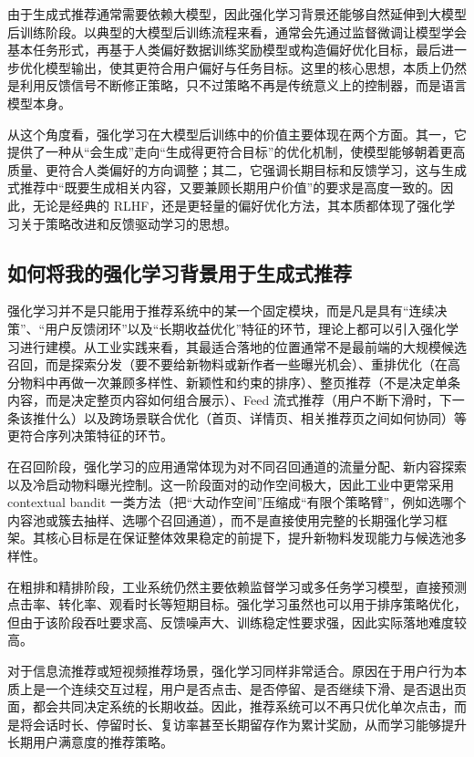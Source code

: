 \documentclass[UTF8]{ctexart}
\begin{document}
由于生成式推荐通常需要依赖大模型，因此强化学习背景还能够自然延伸到大模型后训练阶段。以典型的大模型后训练流程来看，通常会先通过监督微调让模型学会基本任务形式，再基于人类偏好数据训练奖励模型或构造偏好优化目标，最后进一步优化模型输出，使其更符合用户偏好与任务目标。这里的核心思想，本质上仍然是利用反馈信号不断修正策略，只不过策略不再是传统意义上的控制器，而是语言模型本身。

从这个角度看，强化学习在大模型后训练中的价值主要体现在两个方面。其一，它提供了一种从“会生成”走向“生成得更符合目标”的优化机制，使模型能够朝着更高质量、更符合人类偏好的方向调整；其二，它强调长期目标和反馈学习，这与生成式推荐中“既要生成相关内容，又要兼顾长期用户价值”的要求是高度一致的。因此，无论是经典的 RLHF，还是更轻量的偏好优化方法，其本质都体现了强化学习关于策略改进和反馈驱动学习的思想。

\subsection{如何将我的强化学习背景用于生成式推荐}

强化学习并不是只能用于推荐系统中的某一个固定模块，而是凡是具有``连续决策''、``用户反馈闭环''以及``长期收益优化''特征的环节，理论上都可以引入强化学习进行建模。从工业实践来看，其最适合落地的位置通常不是最前端的大规模候选召回，而是探索分发（要不要给新物料或新作者一些曝光机会）、重排优化（在高分物料中再做一次兼顾多样性、新颖性和约束的排序）、整页推荐（不是决定单条内容，而是决定整页内容如何组合展示）、Feed 流式推荐（用户不断下滑时，下一条该推什么）以及跨场景联合优化（首页、详情页、相关推荐页之间如何协同）等更符合序列决策特征的环节。

在召回阶段，强化学习的应用通常体现为对不同召回通道的流量分配、新内容探索以及冷启动物料曝光控制。这一阶段面对的动作空间极大，因此工业中更常采用 contextual bandit 一类方法（把“大动作空间”压缩成“有限个策略臂”，例如选哪个内容池或簇去抽样、选哪个召回通道），而不是直接使用完整的长期强化学习框架。其核心目标是在保证整体效果稳定的前提下，提升新物料发现能力与候选池多样性。

在粗排和精排阶段，工业系统仍然主要依赖监督学习或多任务学习模型，直接预测点击率、转化率、观看时长等短期目标。强化学习虽然也可以用于排序策略优化，但由于该阶段吞吐要求高、反馈噪声大、训练稳定性要求强，因此实际落地难度较高。

对于信息流推荐或短视频推荐场景，强化学习同样非常适合。原因在于用户行为本质上是一个连续交互过程，用户是否点击、是否停留、是否继续下滑、是否退出页面，都会共同决定系统的长期收益。因此，推荐系统可以不再只优化单次点击，而是将会话时长、停留时长、复访率甚至长期留存作为累计奖励，从而学习能够提升长期用户满意度的推荐策略。
\end{document}
